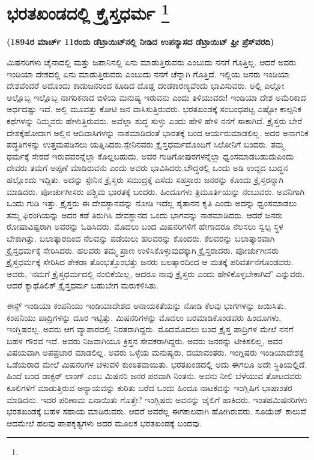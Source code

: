 
\chapter[ಭರತಖಂಡದಲ್ಲಿ ಕ್ರೈಸ್ತಧರ್ಮ ]{ಭರತಖಂಡದಲ್ಲಿ ಕ್ರೈಸ್ತಧರ್ಮ \protect\footnote{}}

\begin{center}
\textbf{(1894ರ ಮಾರ್ಚ್​ 11ರಂದು ಡೆಟ್ರಾಯಿಟ್​ನಲ್ಲಿ ನೀಡಿದ ಉಪನ್ಯಾಸದ ಡೆಟ್ರಾಯಿಟ್​ ಫ್ರೀ ಪ್ರೆಸ್​ ವರದಿ)}
\end{center}

ಮಿಷನರಿಗಳು ಚೈನಾದಲ್ಲಿ ಮತ್ತು ಜಪಾನಿನಲ್ಲಿ ಏನು ಮಾಡುತ್ತಿರುವರು ಎಂಬುದು ನನಗೆ ಗೊತ್ತಿಲ್ಲ. ಆದರೆ ಅವರು ಇಂಡಿಯಾ ದೇಶದಲ್ಲಿ ಏನು ಮಾಡುತ್ತಿರುವರು ಎಂಬುದು ನನಗೆ ಚೆನ್ನಾಗಿ ಗೊತ್ತಿದೆ. ಇಲ್ಲಿಯ ಜನರು ಇಂಡಿಯಾ ದೇಶವೆಂದರೆ ಅದೊಂದು ಕಾಡುಜನರಿಂದ ಕೂಡಿದ ದೊಡ್ಡ ದಂಡಕಾರಣ್ಯವೆಂದು ಭಾವಿಸುವರು. ಅಲ್ಲಿ ಎಲ್ಲೋ ಅಲ್ಲೊಬ್ಬ ಇಲ್ಲೊಬ್ಬ ನಾಗರಿಕನಾದ ಬಿಳಿಯ ಮನುಷ್ಯ ಇರುವನು ಎಂದು ತಿಳಿಯುವರು! ಇಂಡಿಯಾ ದೇಶ ಅಮೆರಿಕಾದ ಅರ್ಧದಷ್ಟು ಇದೆ. ಅಲ್ಲಿ ಮೂವತ್ತು ಕೋಟಿ ಜನ ವಾಸಿಸುತ್ತಿರುವರು. ಭರತಖಂಡಕ್ಕೆ ಸಂಬಂಧಪಟ್ಟ ಎಷ್ಟೋ ಕಾಲ್ಪನಿಕ ಕಥೆಗಳನ್ನು ನಿಮ್ಮವರು ಹೇಳುತ್ತಿರುವರು. ಅವೆಲ್ಲಾ ಶುದ್ಧ ಸುಳ್ಳು ಎಂದು ಹೇಳಿ ಹೇಳಿ ನನಗೆ ಸಾಕಾಗಿದೆ. ಕ್ರೈಸ್ತರು ಬೇರೆ ದೇಶಕ್ಕೆ\break ಹೋದಾಗ ಅಲ್ಲಿನ ಆದಿವಾಸಿಗಳನ್ನು ನಾಶಮಾಡಿದಂತೆ ಭಾರತಕ್ಕೆ ಬಂದ ಆರ್ಯರು\break ಮಾಡಲಿಲ್ಲ. ಅದರ ಅನಾಗರಿಕ ಪದ್ಧತಿಗಳನ್ನು ಉತ್ತಮಪಡಿಸಲು ಯತ್ನಿಸಿದರು.\break ಸ್ಪೇನಿನವರು ಕ್ರೈಸ್ತಧರ್ಮದೊಂದಿಗೆ ಸಿಲೋನಿಗೆ ಬಂದರು. ತಮ್ಮ ಧರ್ಮಕ್ಕೆ ಸೇರದೆ ಇರುವವರನ್ನೆಲ್ಲಾ ಕೊಲ್ಲಬಹುದು, ಅವರ ಗುಡಿಗೋಪುರಗಳನ್ನೆಲ್ಲಾ ಧ್ವಂಸಮಾಡಬಹುದು\break ಎಂದು ದೇವರು ತಮಗೆ ಅಪ್ಪಣೆ ಮಾಡಿರುವನು ಎಂದು ಅವರು ಭಾವಿಸಿದರು.\break ಬೌದ್ಧರಲ್ಲಿ ಒಂದು ಅಡಿ ಉದ್ದದ ಬುದ್ಧನ ಹಲ್ಲೊಂದು ಇದ್ದಿತು. ಅದನ್ನು ಸ್ಪೇನಿನ ಕ್ರೈಸ್ತರು ಸಮುದ್ರಕ್ಕೆ ಎಸೆದು ಸಹಸ್ರಾರು ಜನರನ್ನು ಕೊಂದು ಕ್ರೈಸ್ತರನ್ನಾಗಿ ಮಾಡಿದರು. ಪೋರ್ಚುಗೀಸರು ಪಶ್ಚಿಮ ಭಾರತಕ್ಕೆ ಬಂದರು. ಹಿಂದೂಗಳು ತ್ರಿಮೂರ್ತಿಯನ್ನು ನಂಬುವರು. ಅವನಿಗಾಗಿ ಒಂದು ಗುಡಿ ಇತ್ತು. ಕ್ರೈಸ್ತರು ಈ ದೇವಸ್ಥಾನವನ್ನು ನೋಡಿ ಇದೆಲ್ಲ ಸೈತಾನನ ಕೃತಿ ಎಂದು ಅದನ್ನು ಧ್ವಂಸಮಾಡಲು ತಮ್ಮ ಫಿರಂಗಿಯನ್ನು ಅದರ ಕಡೆ ತಿರುಗಿಸಿ ದೇವಸ್ಥಾನದ ಒಂದು ಭಾಗವನ್ನು ನಾಶಮಾಡಿದರು. ಆದರೆ ಜನರು ರೋಷಾವಿಷ್ಟರಾಗಿ ಅವರನ್ನು ಓಡಿಸಿದರು. ಮೊದಲು ಬಂದ ಮಿಷನರಿಗಳಿಗೆ ಹೇಗಾದರೂ ನೆಲಸಲು ಸ್ವಲ್ಪ ಸ್ಥಳ ಬೇಕಾಗಿತ್ತು. ಬಲಾತ್ಕಾರದಿಂದ ನೆಲವನ್ನು ಪಡೆಯಲು ಹಲವರನ್ನು ಕೊಂದರು. ಕೆಲವರನ್ನು ಬಲಾತ್ಕಾರವಾಗಿ ಕ್ರೈಸ್ತಧರ್ಮಕ್ಕೆ ಸೇರಿಸಿದರು. ಹಲವರು ತಮ್ಮ ಪ್ರಾಣ ಉಳಿಸಿಕೊಳ್ಳುವುದಕ್ಕಾಗಿ ಕ್ರೈಸ್ತರಾದರು. ಪೋರ್ಚುಗೀಸರು ಕ್ರೈಸ್ತಧರ್ಮಕ್ಕೆ ಸೇರಿಸಿದ ಶೇಕಡಾ ತೊಂಭತ್ತೊಂಭತ್ತು ಜನರು ಬಲತ್ಕಾರದಿಂದ ಆ ಮತಕ್ಕೆ ಪರಿವರ್ತನೆಗೊಂಡವರು. ಅವರು, ‘ನಮಗೆ ಕ್ರೈಸ್ತಧರ್ಮದಲ್ಲಿ ನಂಬಿಕೆಯಿಲ್ಲ, ಆದರೂ ನಾವು ಕ್ರೈಸ್ತರು ಎಂದು ಹೇಳಿಕೊಳ್ಳಬೇಕಾಗಿದೆ’ ಎನ್ನುವರು. ಆದರೆ ಕ್ಯಾಥೊಲಿಕ್​ ಕ್ರೈಸ್ತಧರ್ಮ ಬಹುಬೇಗ ಮರುಕಳಿಸಿತು.

ಈಸ್ಟ್ ಇಂಡಿಯಾ ಕಂಪನಿಯು ಇಂಡಿಯಾದೇಶದ ಅನಾಯಕತೆಯನ್ನು ನೋಡಿ ಕೆಲವು ಭಾಗಗಳನ್ನು ಜಯಿಸಿತು. ಕಂಪನಿಯು ಪಾದ್ರಿಗಳನ್ನು ದೂರ ಇಟ್ಟಿತ್ತು. ಮಿಷನರಿಗಳನ್ನು ಮೊದಲು ಬರಮಾಡಿಕೊಂಡವರು ಹಿಂದೂಗಳು, ಇಂಗ್ಲಿಷರಲ್ಲ. ಅವರು ಆಗ ವ್ಯಾಪಾರದಲ್ಲಿ ನಿರತರಾಗಿದ್ದರು. ಮೊದಮೊದಲು ಬಂದ ಕ್ರೈಸ್ತ ಪಾದ್ರಿಗಳ ಮೇಲೆ ನನಗೆ ಬಹಳ ಗೌರವ ಇದೆ. ಅವರು ನಿಜವಾಗಿಯೂ ಕ್ರಿಸ್ತನ ಸೇವಕರಾಗಿದ್ದರು. ಅವರು ಜನರನ್ನು ಟೀಕಿಸಲಿಲ್ಲ, ಅವರ ವಿಷಯವಾಗಿ ಅಪಪ್ರಚಾರ ಮಾಡಲಿಲ್ಲ. ಅವರು ಒಳ್ಳೆಯ ಮನುಷ್ಯರು, ದಯಾವಂತರು. ಇಂಗ್ಲಿಷರು ಇಂಡಿಯಾದೇಶಕ್ಕೆ ಒಡೆಯರಾದ ಮೇಲೆ ಮಿಷನರಿಗಳ ಚಳುವಳಿ ಕುಂಠಿತವಾಯಿತು. ಭರತಖಂಡದಲ್ಲಿ ಅದು ಈಗಲೂ ಅದೇ ಸ್ಥಿತಿಯಲ್ಲಿದೆ. ಹಿಂದೆ ಬಂದ ಡಾಕ್ಟರ್​ ಲಾಂಗ್​ ಎಂಬ ಮಿಷನರಿ ಜನರ ಪರವಾಗಿ ನಿಂತನು. ಅವನು ನೀಲಿ ಬೆಳೆಯುವ ತೋಟದವರು ಕೂಲಿಗಳಿಗೆ ಮಾಡುತ್ತಿರುವ ಅನ್ಯಾಯವನ್ನು ಕುರಿತು ಬರೆದ ಒಂದು ಹಿಂದೂ ನಾಟಕವನ್ನು ಇಂಗ್ಲಿಷಿಗೆ ಭಾಷಾಂತರ ಮಾಡಿದನು. ಇದರ ಪರಿಣಾಮ ಏನಾಯಿತು ಗೊತ್ತೇ? ಇಂಗ್ಲಿಷರು ಅವನನ್ನು ಜೈಲಿಗೆ ಹಾಕಿದರು. ಇಂತಹ\break ಮಿಷನರಿಗಳು ಭರತಖಂಡಕ್ಕೆ ಬಹಳ ಸಹಾಯ ಮಾಡಿರುವರು. ಆದರೆ ಅವರೆಲ್ಲ ಈಗ\break ಕಾಲವಾಗಿ ಹೋಗಿರುವರು. ಸೂಯೆಜ್​ ಕಾಲುವೆ ಆದಮೇಲೆ ಹಲವು ಪಾಪಕೃತ್ಯಗಳು ಅದರ ಮೂಲಕ ಭರತಖಂಡಕ್ಕೆ ಬಂದವು.

